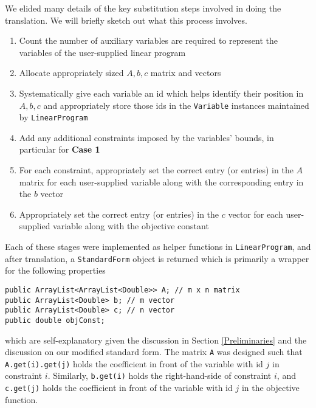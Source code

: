 \documentclass{article}
\newcommand{\javaCode}[1]{\texttt{#1}}
\begin{document}
We elided many details of the key substitution steps involved in doing the translation. We will briefly sketch out what this process involves.
\begin{enumerate}
    \item Count the number of auxiliary variables are required to represent the variables of the user-supplied linear program
    \item Allocate appropriately sized $A, b, c$ matrix and vectors
    \item Systematically give each variable an id which helps identify their position in $A, b, c$ and appropriately store those ids in the \javaCode{Variable} instances maintained by \javaCode{LinearProgram}
    \item Add any additional constraints imposed by the variables' bounds, in particular for \textbf{Case 1}
    \item For each constraint, appropriately set the correct entry (or entries) in the $A$ matrix for each user-supplied variable along with the corresponding entry in the $b$ vector
    \item Appropriately set the correct entry (or entries) in the $c$ vector for each user-supplied variable along with the objective constant
\end{enumerate}
Each of these stages were implemented as helper functions in \javaCode{LinearProgram}, and after translation, a \javaCode{StandardForm} object is returned which is primarily a wrapper for the following properties
\begin{verbatim}
public ArrayList<ArrayList<Double>> A; // m x n matrix
public ArrayList<Double> b; // m vector
public ArrayList<Double> c; // n vector
public double objConst;
\end{verbatim}
which are self-explanatory given the discussion in Section \ref{Preliminaries} and the discussion on our modified standard form. The matrix \javaCode{A} was designed such that \javaCode{A.get(i).get(j)} holds the coefficient in front of the variable with id $j$ in constraint $i$. Similarly, \javaCode{b.get(i)} holds the right-hand-side of constraint $i$, and \javaCode{c.get(j)} holds the coefficient in front of the variable with id $j$ in the objective function.
\end{document}
